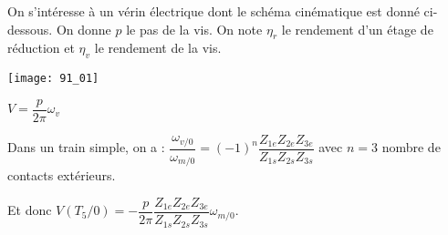 \normaltrue \difficilefalse \tdifficilefalse
\correctionfalse


\setcounter{question}{0}

\ifcorrection
\else
{}
\fi

\ifprof
\else
On s’intéresse à un vérin électrique dont le schéma cinématique est donné ci-dessous. On donne $p$ le pas de la vis. On note $\eta_r$ le rendement d'un étage de réduction et $\eta_v$ le rendement de la vis.
\begin{marginfigure}
\texttt{[image: 91\_01]}
\end{marginfigure}


\fi


\ifprof
\begin{corrige}
$V =\dfrac{p}{2\pi} \omega_v$
\end{corrige}
\else
\fi

\ifprof 
\begin{corrige}
Dans un train simple, on a : $\dfrac{\omega_{v/0}}{\omega_{m/0}} = (-1)^n \dfrac{Z_{1e}Z_{2e}Z_{3e}}{Z_{1s}Z_{2s}Z_{3s}}$ avec $n=3$ nombre de contacts extérieurs.

Et donc $V(T_5/0) =-\dfrac{p}{2\pi} \dfrac{Z_{1e}Z_{2e}Z_{3e}}{Z_{1s}Z_{2s}Z_{3s}} \omega_{m/0}$.

\end{corrige}
\else

\fi





\ifprof
\else


\fi